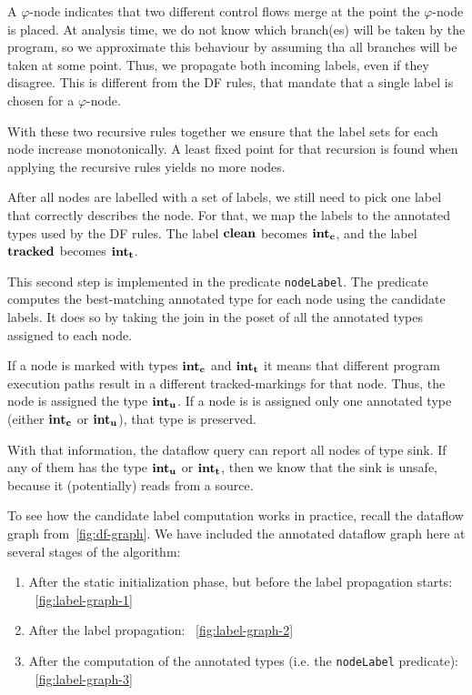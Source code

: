 A $\varphi$-node indicates that two different control flows merge at the point
the $\varphi$-node is placed.
At analysis time, we do not know which branch(es) will be taken by the program,
so we approximate this behaviour by assuming tha all branches will be taken at some point.
Thus, we propagate both incoming labels, even if they disagree.
This is different from the DF rules, that mandate that a single label is chosen
for a $\varphi$-node.

With these two recursive rules together we ensure that the label sets for each node
increase monotonically.
A least fixed point for that recursion is found when applying the recursive rules yields
no more nodes.

After all nodes are labelled with a set of labels, we still need to pick one label
that correctly describes the node.
For that, we map the labels to the annotated types used by the DF rules.
The label $\textbf{clean}$ becomes $\textbf{int}_\textbf{c}$, and the label $\textbf{tracked}$ becomes $\textbf{int}_\textbf{t}$.

This second step is implemented in the predicate \texttt{nodeLabel}.
The predicate computes the best-matching annotated type for each node using the candidate labels.
It does so by taking the join in the poset of all the annotated types assigned to each node.

If a node is marked with types $\textbf{int}_\textbf{c}$ and $\textbf{int}_\textbf{t}$ it means that different
program execution paths result in a different tracked-markings for that node.
Thus, the node is assigned the type $\textbf{int}_\textbf{u}$.
If a node is is assigned only one annotated type (either $\textbf{int}_\textbf{c}$ or $\textbf{int}_\textbf{u}$), 
that type is preserved.

With that information, the dataflow query can report all nodes of type sink.
If any of them has the type $\textbf{int}_\textbf{u}$ or $\textbf{int}_\textbf{t}$, then we know that the sink
is unsafe, because it (potentially) reads from a source.

To see how the candidate label computation works in practice, recall the dataflow graph
from~\autoref{fig:df-graph}.
We have included the annotated dataflow graph here at several stages of the algorithm:
\begin{enumerate}
    \item After the static initialization phase, but before the label propagation starts:
     ~\autoref{fig:label-graph-1}
    \item After the label propagation: ~\autoref{fig:label-graph-2}
    \item After the computation of the annotated types (i.e. the \texttt{nodeLabel} predicate):
     ~\autoref{fig:label-graph-3}
\end{enumerate}

